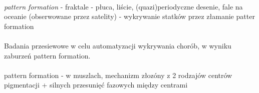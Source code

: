 \documentclass[a4paper,10pt]{article}
\begin{document}
\paragraph{} \textit{pattern formation} - fraktale - płuca, liście, (quazi)periodyczne desenie, fale na oceanie (obserwowane przez satelity) - wykrywanie statków przez złamanie  patter formation
\paragraph{} Badania przesiewowe w celu automatyzacji wykrywania chorób, w wyniku zaburzeń pattern formation.
\paragraph{} pattern formation - w muszlach, mechanizm złozóny z 2 rodzajów centrów pigmentacji + silnych przesunięć fazowych między centrami
\end{document}
